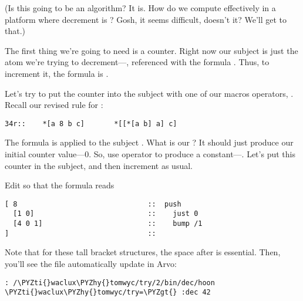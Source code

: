 (Is this going to be an  algorithm?  It is.  How do we
compute effectively in a platform where decrement is ?
Gosh, it seems difficult, doesn't it?  We'll get to that.)

The first thing we're going to need is a counter.  Right now
our subject is just the atom we're trying to decrement---,
referenced with the formula \kode{[0 1]}.  Thus, to increment it,
the formula is \kode{[4 0 1]}.

Let's try to put the counter into the subject with one of our
macros operators, .  Recall our revised rule for :

\begin{framed_shaded}
\begin{Verbatim}[fontsize=\relsize{-2.5},fontseries=b,commandchars=\\\{\}]
34r::    *[a 8 b c]       *[[*[a b] a] c]
\end{Verbatim}
\end{framed_shaded}

The formula  is applied to the subject \kode{[*[a b] a]}.  What is
our ?  It should just produce our initial counter value---0.
So, use operator  to produce a constant---\kode{[1 0]}.  Let's
put this counter in the subject, and then increment as usual.

Edit  so that the formula reads

\begin{framed_shaded}
\begin{Verbatim}[fontsize=\relsize{-2.5},fontseries=b,commandchars=\\\{\}]
[ 8                               ::  push
  [1 0]                           ::    just 0
  [4 0 1]                         ::    bump /1
]                                 ::
\end{Verbatim}
\end{framed_shaded}

Note that for these tall bracket structures, the space after \kode{[}
is essential.  Then, you'll see the file automatically update in
Arvo:

\begin{framed_shaded}
\begin{Verbatim}[fontsize=\relsize{-2.5},fontseries=b,commandchars=\\\{\}]
: /\PYZti{}waclux\PYZhy{}tomwyc/try/2/bin/dec/hoon
\PYZti{}waclux\PYZhy{}tomwyc/try=\PYZgt{} :dec 42
\end{Verbatim}
\end{framed_shaded}

